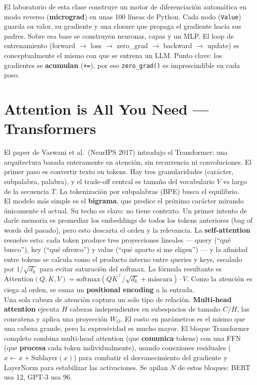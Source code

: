 \documentclass[11pt,a4paper]{article}
\begin{document}
El laboratorio de esta clase construye un motor de diferenciaci\'on autom\'atica en modo reverso (\textbf{micrograd}) en unas 100 l\'ineas de Python. Cada nodo (\texttt{Value}) guarda su valor, su gradiente y una closure que propaga el gradiente hacia sus padres. Sobre esa base se construyen neuronas, capas y un MLP. El loop de entrenamiento (forward $\to$ loss $\to$ zero\_grad $\to$ backward $\to$ update) es conceptualmente el mismo con que se entrena un LLM. Punto clave: los gradientes se \textbf{acumulan} (\texttt{+=}), por eso \texttt{zero\_grad()} es imprescindible en cada paso. \\[1ex]

\section{Attention is All You Need --- Transformers}

El paper de Vaswani et al.\ (NeurIPS 2017) introdujo el Transformer: una arquitectura basada enteramente en atenci\'on, sin recurrencia ni convoluciones. El primer paso es convertir texto en tokens. Hay tres granularidades (car\'acter, subpalabra, palabra), y el trade-off central es tama\~no del vocabulario $V$ vs largo de la secuencia $T$. La tokenizaci\'on por subpalabras (BPE) busca el equilibrio. \\[1ex]

El modelo m\'as simple es el \textbf{bigrama}, que predice el pr\'oximo car\'acter mirando \'unicamente el actual. Su techo es claro: no tiene contexto. Un primer intento de darle memoria es promediar los embeddings de todos los tokens anteriores (bag of words del pasado), pero esto descarta el orden y la relevancia. La \textbf{self-attention} resuelve esto: cada token produce tres proyecciones lineales --- query (``qu\'e busco''), key (``qu\'e ofrezco'') y value (``qu\'e aporto si me eligen'') --- y la afinidad entre tokens se calcula como el producto interno entre queries y keys, escalado por $1/\sqrt{d_k}$ para evitar saturaci\'on del softmax. La f\'ormula resultante es $\text{Attention}(Q,K,V) = \text{softmax}(QK^\top/\sqrt{d_k} + \text{m\'ascara}) \cdot V$. Como la atenci\'on es ciega al orden, se suma un \textbf{positional encoding} a la entrada. \\[1ex]

Una sola cabeza de atenci\'on captura un solo tipo de relaci\'on. \textbf{Multi-head attention} ejecuta $H$ cabezas independientes en subespacios de tama\~no $C/H$, las concatena y aplica una proyecci\'on $W_O$. El costo en par\'ametros es el mismo que una cabeza grande, pero la expresividad es mucho mayor. El bloque Transformer completo combina multi-head attention (que \textbf{comunica} tokens) con una FFN (que \textbf{procesa} cada token individualmente), usando conexiones residuales ($x \leftarrow x + \text{Sublayer}(x)$) para combatir el desvanecimiento del gradiente y LayerNorm para estabilizar las activaciones. Se apilan $N$ de estos bloques: BERT usa 12, GPT-3 usa 96. \\[1ex]
\end{document}

